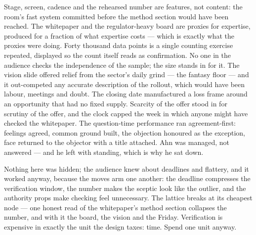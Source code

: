 \begin{lattice}
   Stage, screen, cadence and the rehearsed number are features, not content: the room's fast system committed before the method section would have been reached.
   The whitepaper and the regulator-heavy board are proxies for expertise, produced for a fraction of what expertise costs --- which is exactly what the proxies were doing.
   Forty thousand data points is a single counting exercise repeated, displayed so the count itself reads as confirmation. No one in the audience checks the independence of the sample; the size stands in for it.
   The vision slide offered relief from the sector's daily grind --- the fantasy floor --- and it out-competed any accurate description of the rollout, which would have been labour, meetings and doubt.
   The closing date manufactured a loss frame around an opportunity that had no fixed supply. Scarcity of the offer stood in for scrutiny of the offer, and the clock capped the week in which anyone might have checked the whitepaper.
   The question-time performance ran agreement-first: feelings agreed, common ground built, the objection honoured as the exception, face returned to the objector with a title attached. Ahn was managed, not answered --- and he left with standing, which is why he sat down.
\end{lattice}

\begin{lesson}
Nothing here was hidden; the audience knew about deadlines and flattery, and it worked anyway, because the moves arm one another: the deadline compresses the verification window, the number makes the sceptic look like the outlier, and the authority props make checking feel unnecessary. The lattice breaks at its cheapest node --- one honest read of the whitepaper's method section collapses the number, and with it the board, the vision and the Friday. Verification is expensive in exactly the unit the design taxes: time. Spend one unit anyway.
\end{lesson}
